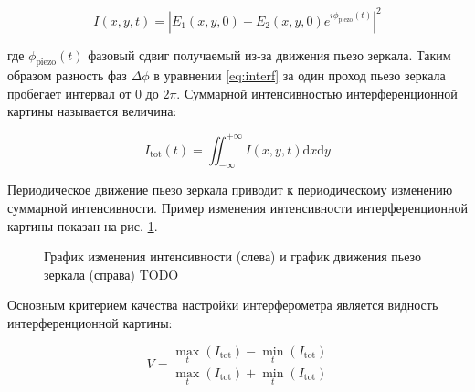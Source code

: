 \begin{equation}
    I(x,y,t)=|E_1(x,y,0)+E_2(x,y,0)e^{i\phi_{\mathrm{piezo}}(t)}|^2  
\end{equation}

где $\phi_{\mathrm{piezo}}(t)$ фазовый сдвиг получаемый из-за движения пьезо зеркала. Таким образом разность фаз $\Delta \phi$ в уравнении \ref{eq:interf} за один проход пьезо зеркала пробегает интервал от $0$ до $2\pi$. Суммарной интенсивностью интерференционной картины называется величина: 

\begin{equation}
    I_{\mathrm{tot}}(t) = \iint_{-\infty}^{+\infty} I(x, y, t) {\mathrm{d}}x{\mathrm{d}}y
\end{equation}

Периодическое движение пьезо зеркала приводит к периодическому изменению суммарной интенсивности. Пример изменения интенсивности интерференционной картины показан на рис. \ref{fig:intens_plot}.

\begin{figure}[ht]
\caption{График изменения интенсивности (слева) и график движения пьезо зеркала (справа) TODO}
\label{fig:intens_plot}
\end{figure}

Основным критерием качества настройки интерферометра является видность интерференционной картины: 

\begin{equation}
    V = \frac{            
        \max_{t}(I_{\mathrm{tot}}) - \min_t(I_{\mathrm{tot}})}
        {\max_{t}(I_{\mathrm{tot}}) + \min_t(I_{\mathrm{tot}})}
    \label{eq:visib}
\end{equation}

